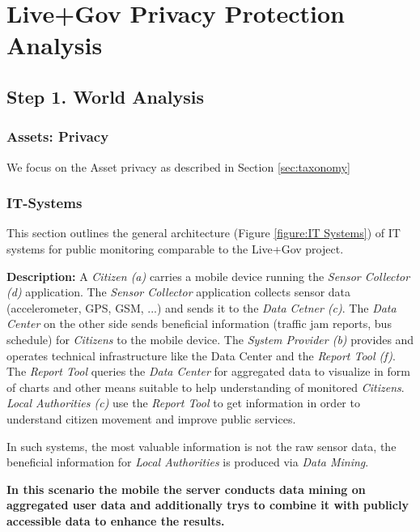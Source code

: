 \section{Live+Gov Privacy Protection Analysis}

\subsection{Step 1. World Analysis}

\subsubsection{Assets: Privacy}

We focus on the Asset privacy as described in Section \ref{sec:taxonomy}


\subsubsection{IT-Systems}

This section outlines the general architecture (Figure \ref{figure:IT Systems}) of IT systems for public monitoring comparable to the Live+Gov project.



\textbf{Description:}
A \textit{Citizen (a)} carries a mobile device running the \textit{Sensor Collector (d)} application.
The \textit{Sensor Collector} application collects sensor data (accelerometer, GPS, GSM, ...) and sends it to the \textit{Data Cetner (c)}. 
The \textit{Data Center} on the other side sends beneficial information (traffic jam reports, bus schedule) for \textit{Citizens} to the mobile device.
The \textit{System Provider (b)} provides and operates technical infrastructure like the Data Center and the \textit{Report Tool (f)}.
The \textit{Report Tool} queries the \textit{Data Center} for aggregated data to visualize in form of charts and other means suitable to help understanding of monitored \textit{Citizens}. 
\textit{Local Authorities (c)} use the \textit{Report Tool} to get information in order to understand citizen movement and improve public services. 

In such systems, the most valuable information is not the raw sensor data, the beneficial information for \textit{Local Authorities} is produced via \textit{Data Mining}. 

\textbf{In this
scenario the mobile the server conducts data mining on aggregated user
data and additionally trys to combine it with publicly accessible data
to enhance the results.}

